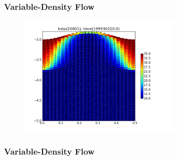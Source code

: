 \documentclass[t]{beamer}
\begin{document}
\begin{frame}[fragile]
\frametitle{Variable-Density Flow}
  \begin{figure}[ht]
  \centering
         \includegraphics[height=6cm]{figures/bedform.png}
   \end{figure}
\end{frame}


\begin{frame}[fragile]
\frametitle{Variable-Density Flow}
\begin{center}
\end{center}
\end{frame}
\end{document}
